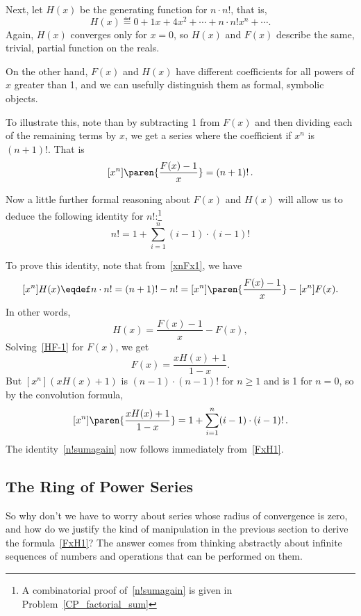 Next, let $H(x)$ be the generating function for $n
\cdot n!$, that is, 
\[
H(x) \eqdef 0 + 1x + 4x^2 + \cdots + n\cdot n! x^n + \cdots.
\]
Again, $H(x)$ converges only for $x = 0$, so $H(x)$ and $F(x)$
  describe the same, trivial, partial function on the reals.

On the other hand, $F(x)$ and $H(x)$ have different coefficients for
  all powers of $x$ greater than 1, and we can usefully distinguish
  them as formal, symbolic objects.

To illustrate this, note than by subtracting 1 from $F(x)$ and then
dividing each of the remaining terms by $x$, we get a series where the
coefficient if $x^n$ is $(n+1)!$.  That is
\begin{equation}\label{xnFx1}
[x^n]\paren{\frac{F(x) - 1}{x}} = (n+1)!\, .
\end{equation}

Now a little further formal reasoning about $F(x)$ and $H(x)$ will
allow us to deduce the following identity for $n!$:\footnote{A
combinatorial proof of~\eqref{n!sumagain} is given in
Problem~\ref{CP_factorial_sum}}
\begin{equation}\label{n!sumagain}
n! = 1 + \sum_{i=1}^{n} (i-1) \cdot (i-1)!
\end{equation}

To prove this identity, note that from~\eqref{xnFx1}, we have
\[
[x^n]H(x) \eqdef n \cdot n! = (n+1)! - n! = [x^n]\paren{\frac{F(x) - 1}{x}} - [x^n]F(x).
\]
In other words,
\begin{equation}\label{HF-1}
H(x) = \frac{F(x) - 1}{x} - F(x),
\end{equation}
Solving~\eqref{HF-1} for $F(x)$, we get
\begin{equation}\label{FxH1}
F(x) = \frac{xH(x)+1}{1-x}.
\end{equation}
But $[x^n](xH(x)+1)$ is $(n-1) \cdot (n-1)!$ for $n \geq 1$ and is 1
for $n=0$, so by the convolution formula,
\[
[x^n]\paren{\frac{xH(x)+1}{1-x}} = 1 + \sum_{i=1}^{n} (i-1) \cdot (i-1)! \, .
\]
The identity~\eqref{n!sumagain} now follows immediately
from~\eqref{FxH1}.

\subsection{The Ring of Power Series}
So why don't we have to worry about series whose radius of convergence
is zero, and how do we justify the kind of manipulation in the
previous section to derive the formula~\eqref{FxH1}?  The answer comes
from thinking abstractly about infinite sequences of numbers and
operations that can be performed on them.

